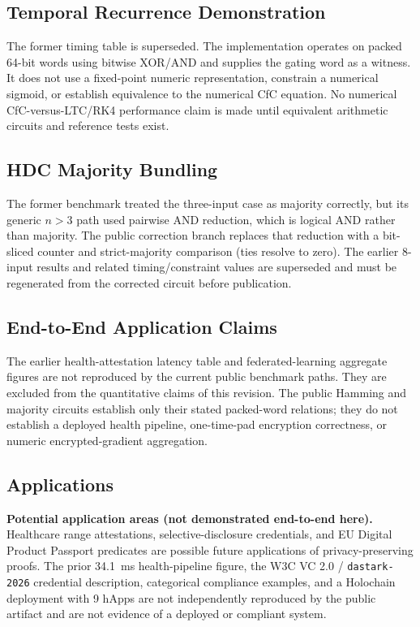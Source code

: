 \documentclass[11pt,twocolumn]{article}
\begin{document}
\subsection{Temporal Recurrence Demonstration}

The former timing table is superseded. The implementation operates on packed 64-bit words using bitwise XOR/AND and supplies the gating word as a witness. It does not use a fixed-point numeric representation, constrain a numerical sigmoid, or establish equivalence to the numerical CfC equation. No numerical CfC-versus-LTC/RK4 performance claim is made until equivalent arithmetic circuits and reference tests exist.

\subsection{HDC Majority Bundling}

The former benchmark treated the three-input case as majority correctly, but its generic $n>3$ path used pairwise AND reduction, which is logical AND rather than majority. The public correction branch replaces that reduction with a bit-sliced counter and strict-majority comparison (ties resolve to zero). The earlier 8-input results and related timing/constraint values are superseded and must be regenerated from the corrected circuit before publication.

\subsection{End-to-End Application Claims}

The earlier health-attestation latency table and federated-learning aggregate figures are not reproduced by the current public benchmark paths. They are excluded from the quantitative claims of this revision. The public Hamming and majority circuits establish only their stated packed-word relations; they do not establish a deployed health pipeline, one-time-pad encryption correctness, or numeric encrypted-gradient aggregation.

\subsection{Applications}

\textbf{Potential application areas (not demonstrated end-to-end here).} Healthcare range attestations, selective-disclosure credentials, and EU Digital Product Passport predicates are possible future applications of privacy-preserving proofs. The prior 34.1~ms health-pipeline figure, the W3C VC 2.0 / \texttt{dastark-2026} credential description, categorical compliance examples, and a Holochain deployment with 9 hApps are not independently reproduced by the public artifact and are not evidence of a deployed or compliant system.
\end{document}
